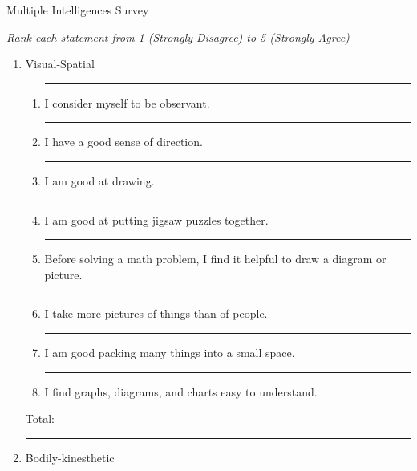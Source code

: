 \documentclass[letterpaper, 10pt]{article}
\begin{document}
	


\begin{center} Multiple Intelligences Survey
\end{center}

\textit{Rank each statement from 1-(Strongly Disagree) to 5-(Strongly Agree)}



\begin{enumerate}


	
\item Visual-Spatial 


	\begin{enumerate}
		
	\item \rule{.5in}{.01in} I consider myself to be observant.
	\item \rule{.5in}{.01in} I have a good sense of direction.
	\item \rule{.5in}{.01in} I am good at drawing.
	\item \rule{.5in}{.01in} I am good at putting jigsaw puzzles together.
	\item \rule{.5in}{.01in} Before solving a math problem, I find it helpful to draw a diagram or picture.
	\item \rule{.5in}{.01in} I take more pictures of things than of people.
	\item \rule{.5in}{.01in} I am good packing many things into a small space.
	\item \rule{.5in}{.01in} I find graphs, diagrams, and charts easy to understand.
	\end{enumerate}
Total:  \rule{.5in}{.01in}

\vspace{.1in}
\item Bodily-kinesthetic


\begin{enumerate}
	

\end{enumerate}
\end{enumerate}
\end{document}
